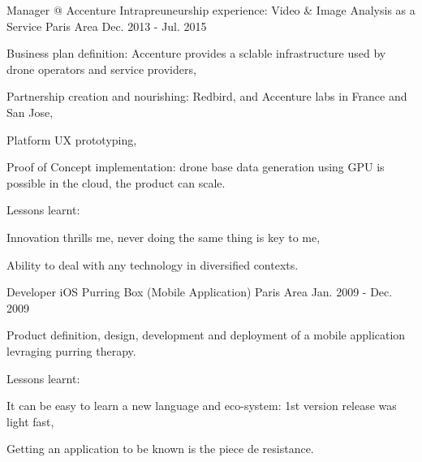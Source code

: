 
\begin{cventries}

  \cventry
    {Manager @ Accenture} %
    {Intrapreuneurship experience: Video \& Image Analysis as a Service} %
    {Paris Area} %
    {Dec. 2013 - Jul. 2015} %
    {
      \begin{cvitems} %
        \item {Business plan definition: Accenture provides a sclable infrastructure used by drone operators and service providers,}
        \item {Partnership creation and nourishing: Redbird, and Accenture labs in France and San Jose,}
        \item {Platform UX prototyping,}
        \item {Proof of Concept implementation: drone base data generation using GPU is possible in the cloud, the product can scale.}
        \item {Lessons learnt:}
        \begin{cvsubitems}
          \item {Innovation thrills me, never doing the same thing is key to me,}
          \item {Ability to deal with any technology in diversified contexts.}
        \end{cvsubitems}
      \end{cvitems}
    }

  \cventry
    {Developer iOS} %
    {Purring Box (Mobile Application)} %
    {Paris Area} %
    {Jan. 2009 - Dec. 2009} %
    {
      \begin{cvitems} %
        \item {Product definition, design, development and deployment of a mobile application levraging purring therapy.}
        \item {Lessons learnt:}
        \begin{cvsubitems}
          \item {It can be easy to learn a new language and eco-system: 1st version release was light fast,}
          \item {Getting an application to be known is the piece de resistance.}
        \end{cvsubitems}
      \end{cvitems}
    }


\end{cventries}
